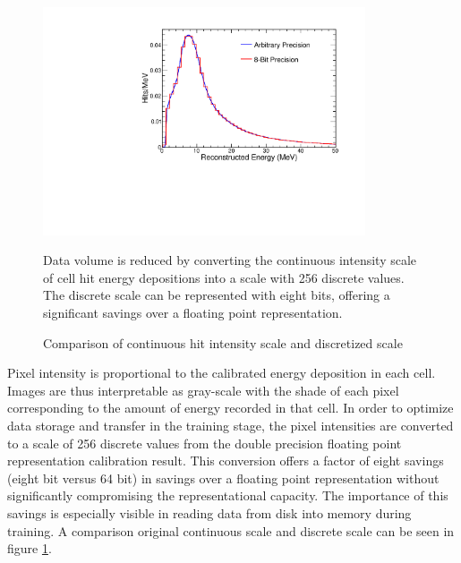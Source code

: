 \begin{figure}[t]
\begin{center}
\includegraphics[width=0.85\textwidth]{figures/cnn/discrete_intensity.pdf}
\end{center}
\caption{Comparison of continuous hit intensity scale and discretized scale}{
Data volume is reduced by converting the continuous intensity scale of cell
hit energy depositions into a scale with 256 discrete values.
The discrete scale can be represented with eight bits, offering a significant
savings over a floating point representation.
}
\label{pixelmapadc}
\end{figure}


Pixel intensity is proportional to the calibrated energy deposition
in each cell.
Images are thus interpretable as gray-scale with the shade of
each pixel corresponding to the amount of energy recorded in that cell.
In order to optimize data storage and transfer in the training stage,
the pixel intensities are converted to a scale of 256 discrete values
from the double precision floating point representation calibration result.
This conversion offers a factor of eight savings (eight bit versus 64 bit) in
savings over a floating point representation
without significantly compromising the representational capacity.
The importance of this savings is especially visible in reading data from
disk into memory during training.
A comparison original continuous scale and discrete scale can be seen in figure
\ref{pixelmapadc}.

